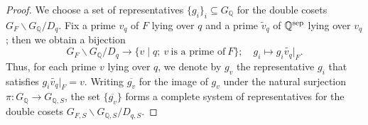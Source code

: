\documentclass{article}
\numberwithin{equation}{section} %
\begin{document}
            \begin{proof}

                We choose a set of representatives $\{g_i\}_i \subseteq G_{\mathbb{Q}}$ for the double cosets $G_F\backslash G_{\mathbb{Q}}/D_q$. Fix a prime $v_q$ of $F$ lying over $q$ and a prime $\widetilde{v}_q$ of $\mathbb{Q}^{\rm sep}$ lying over $v_q$; then we obtain a bijection
\[
G_F\backslash G_{\mathbb{Q}}/D_q \to \{v \mid q; \ v \ \text{is a prime of} \ F\}; \quad g_i \mapsto g_i\widetilde{v_q}|_F.
\]
Thus, for each prime $v$ lying over $q$, we denote by $g_v$ the representative $g_i$ that satisfies $g_i\widetilde{v_q}|_F = v$. Writing $\overline{g_v}$ for the image of $g_v$ under the natural surjection $\pi: G_{\mathbb{Q}} \to G_{\mathbb{Q},S}$, the set $\{\overline{g_v}\}$ forms a complete system of representatives for the double cosets $G_{F,S}\backslash G_{\mathbb{Q},S}/D_{q,S}$.


\end{proof}
\end{document}
